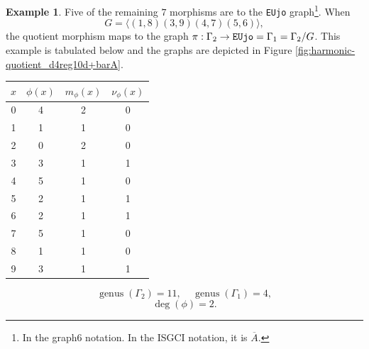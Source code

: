 \documentclass[12pt,letterpaper]{article}
\theoremstyle{definition}
\newtheorem{example}[theorem]{Example}
\DeclareMathOperator{\genus}{genus}
\begin{document}
\begin{example}
{Five of the remaining $7$ morphisms are to the 
\verb+EUjo+ graph\footnote{In the graph6 notation.
In the ISGCI notation, it is $\overline{A}$.}.
When
\[
G = \langle (1,8)(3,9)(4,7)(5,6) \rangle ,
\]
the quotient morphism maps to the  graph
$\pi: \Gamma_2\to {\tt EUjo}=\Gamma_1=\Gamma_2/G $. This example
is tabulated below and the graphs are depicted in
Figure \ref{fig:harmonic-quotient_d4reg10d+barA}.

\begin{center}
\begin{tabular}{c|c|c|c}  
  $x$ & $\phi(x)$ & $m_\phi(x)$ & $\nu_\phi(x)$ \\ \hline
  0   &    4   &        2         &  0   \\ 
  1   &    1   &        1         &  0  \\ 
  2   &    0   &        2         &  0  \\ 
  3   &    3   &        1         &  1  \\ 
  4   &    5   &        1         &  0   \\
  5   &    2   &        1         &  1   \\
  6   &    2   &        1         &  1   \\
  7   &    5   &        1         &  0   \\
  8   &    1   &        1         &  0   \\
  9   &    3   &        1         &  1   \\     
\end{tabular}
\end{center}

\[
  \genus(\Gamma_2) =11,\ \ \ \ \
  \genus(\Gamma_1) =4,
\]
\[
\deg(\phi) =2.
\]

}
\end{example}
\end{document}
